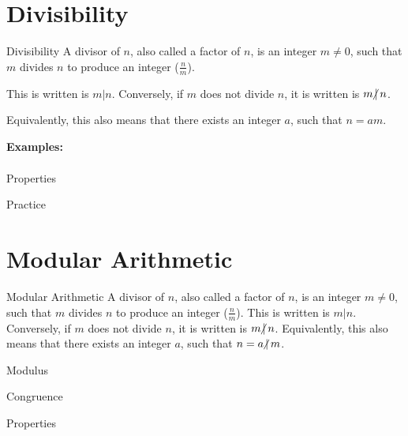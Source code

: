 \documentclass{beamer}
\newcommand{\ndiv}{\hspace{-4pt}\not|\hspace{2pt}}
\begin{document}
\section{Divisibility}
\begin{frame}{Divisibility}
    A divisor of $n$, also called a factor of $n$, is an integer $m \neq 0$, such that $m$ divides $n$ to produce an integer ($\frac{n}{m}$). \newline
    
    This is written is $m | n$. Conversely, if $m$ does not divide $n$, it is written is $m \ndiv n$. \newline
    
    Equivalently, this also means that there exists an integer $a$, such that $n = am$. \newline
    
    \textbf{Examples:}
    \begin{align*}
        
    \end{align*}
    
\end{frame}

\begin{frame}{Properties}
    
\end{frame}

\begin{frame}{Practice}
    
\end{frame}

\section{Modular Arithmetic}
\begin{frame}{Modular Arithmetic}
A divisor of $n$, also called a factor of $n$, is an integer $m \neq 0$, such that $m$ divides $n$ to produce an integer ($\frac{n}{m}$). This is written is $m | n$. Conversely, if $m$ does not divide $n$, it is written is $m \ndiv n$. Equivalently, this also means that there exists an integer $a$, such that $n = a \ndiv m$.
\end{frame}

\begin{frame}{Modulus}
    
\end{frame}

\begin{frame}{Congruence}
    
\end{frame}

\begin{frame}{Properties}
    
\end{frame}
\end{document}
